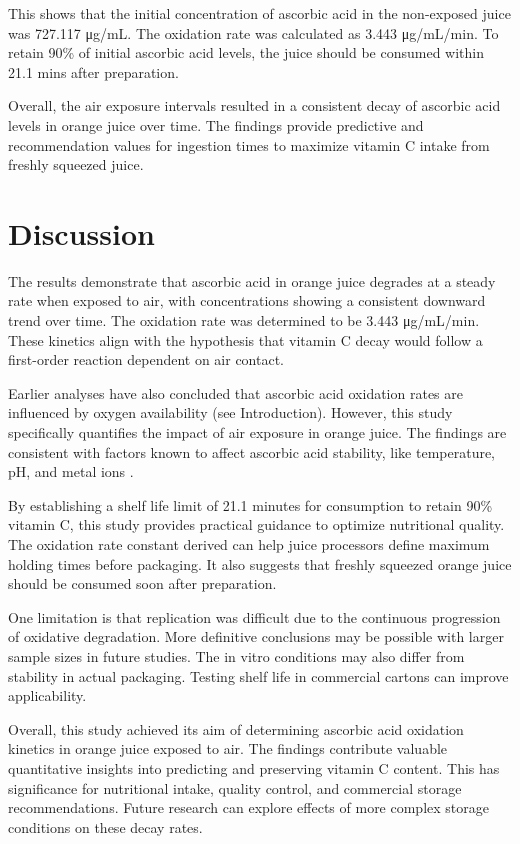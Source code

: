 \documentclass[]{report}
\begin{document}
\begin{multicols}{2}
This shows that the initial concentration of ascorbic acid in the non-exposed juice was 727.117 μg/mL. The oxidation rate was calculated as 3.443 μg/mL/min. To retain 90\% of initial ascorbic acid levels, the juice should be consumed within 21.1 mins after preparation.

Overall, the air exposure intervals resulted in a consistent decay of ascorbic acid levels in orange juice over time. The findings provide predictive and recommendation values for ingestion times to maximize vitamin C intake from freshly squeezed juice.

\section{Discussion}
The results demonstrate that ascorbic acid in orange juice degrades at a steady rate when exposed to air, with concentrations showing a consistent downward trend over time. The oxidation rate was determined to be 3.443 μg/mL/min. These kinetics align with the hypothesis that vitamin C decay would follow a first-order reaction dependent on air contact. 

Earlier analyses have also concluded that ascorbic acid oxidation rates are influenced by oxygen availability (see Introduction). However, this study specifically quantifies the impact of air exposure in orange juice. The findings are consistent with factors known to affect ascorbic acid stability, like temperature, pH, and metal ions \cite{wikipedia}. 

By establishing a shelf life limit of 21.1 minutes for consumption to retain 90\% vitamin C, this study provides practical guidance to optimize nutritional quality. The oxidation rate constant derived can help juice processors define maximum holding times before packaging. It also suggests that freshly squeezed orange juice should be consumed soon after preparation.

One limitation is that replication was difficult due to the continuous progression of oxidative degradation. More definitive conclusions may be possible with larger sample sizes in future studies. The in vitro conditions may also differ from stability in actual packaging. Testing shelf life in commercial cartons can improve applicability.  

Overall, this study achieved its aim of determining ascorbic acid oxidation kinetics in orange juice exposed to air. The findings contribute valuable quantitative insights into predicting and preserving vitamin C content. This has significance for nutritional intake, quality control, and commercial storage recommendations. Future research can explore effects of more complex storage conditions on these decay rates.
\end{multicols}



\end{document}

